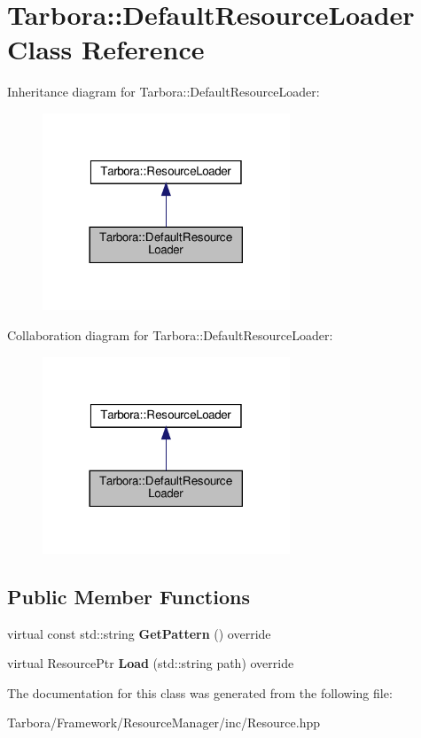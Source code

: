 \hypertarget{classTarbora_1_1DefaultResourceLoader}{}\section{Tarbora\+:\+:Default\+Resource\+Loader Class Reference}
\label{classTarbora_1_1DefaultResourceLoader}


Inheritance diagram for Tarbora\+:\+:Default\+Resource\+Loader\+:\nopagebreak
\begin{figure}[H]
\begin{center}
\leavevmode
\includegraphics[width=209pt]{classTarbora_1_1DefaultResourceLoader__inherit__graph}
\end{center}
\end{figure}


Collaboration diagram for Tarbora\+:\+:Default\+Resource\+Loader\+:\nopagebreak
\begin{figure}[H]
\begin{center}
\leavevmode
\includegraphics[width=209pt]{classTarbora_1_1DefaultResourceLoader__coll__graph}
\end{center}
\end{figure}
\subsection*{Public Member Functions}
\begin{DoxyCompactItemize}
\item 
\mbox{\label{classTarbora_1_1DefaultResourceLoader_abaa82242f38847dd837aa5dbc61c9242}} 
virtual const std\+::string {\bfseries Get\+Pattern} () override
\item 
\mbox{\label{classTarbora_1_1DefaultResourceLoader_a0363155f8c67c42055c240aa95f9962d}} 
virtual Resource\+Ptr {\bfseries Load} (std\+::string path) override
\end{DoxyCompactItemize}


The documentation for this class was generated from the following file\+:\begin{DoxyCompactItemize}
\item 
Tarbora/\+Framework/\+Resource\+Manager/inc/Resource.\+hpp\end{DoxyCompactItemize}
